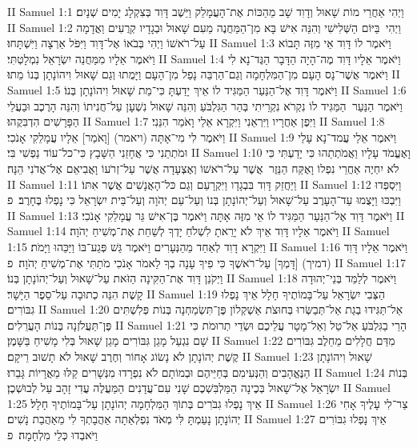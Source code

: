 II Samuel 1:1	וַיְהִי אַחֲרֵי מוֹת שָׁאוּל וְדָוִד שָׁב מֵהַכּוֹת אֶת־הָעֲמָלֵק וַיֵּשֶׁב דָּוִד בְּצִקְלָג יָמִים שְׁנָיִם׃
II Samuel 1:2	וַיְהִי  בַּיּוֹם הַשְּׁלִישִׁי וְהִנֵּה אִישׁ בָּא מִן־הַמַּחֲנֶה מֵעִם שָׁאוּל וּבְגָדָיו קְרֻעִים וַאֲדָמָה עַל־רֹאשׁוֹ וַיְהִי בְּבֹאוֹ אֶל־דָּוִד וַיִּפֹּל אַרְצָה וַיִּשְׁתָּחוּ׃
II Samuel 1:3	וַיֹּאמֶר לוֹ דָּוִד אֵי מִזֶּה תָּבוֹא וַיֹּאמֶר אֵלָיו מִמַּחֲנֵה יִשְׂרָאֵל נִמְלָטְתִּי׃
II Samuel 1:4	וַיֹּאמֶר אֵלָיו דָּוִד מֶה־הָיָה הַדָּבָר הַגֶּד־נָא לִי וַיֹּאמֶר אֲשֶׁר־נָס הָעָם מִן־הַמִּלְחָמָה וְגַם־הַרְבֵּה נָפַל מִן־הָעָם וַיָּמֻתוּ וְגַם שָׁאוּל וִיהוֹנָתָן בְּנוֹ מֵתוּ׃
II Samuel 1:5	וַיֹּאמֶר דָּוִד אֶל־הַנַּעַר הַמַּגִּיד לוֹ אֵיךְ יָדַעְתָּ כִּי־מֵת שָׁאוּל וִיהוֹנָתָן בְּנוֹ׃
II Samuel 1:6	וַיֹּאמֶר הַנַּעַר  הַמַּגִּיד לוֹ נִקְרֹא נִקְרֵיתִי בְּהַר הַגִּלְבֹּעַ וְהִנֵּה שָׁאוּל נִשְׁעָן עַל־חֲנִיתוֹ וְהִנֵּה הָרֶכֶב וּבַעֲלֵי הַפָּרָשִׁים הִדְבִּקֻהוּ׃
II Samuel 1:7	וַיִּפֶן אַחֲרָיו וַיִּרְאֵנִי וַיִּקְרָא אֵלַי וָאֹמַר הִנֵּנִי׃
II Samuel 1:8	וַיֹּאמֶר לִי מִי־אָתָּה (ויאמר) [וָאֹמַר] אֵלָיו עֲמָלֵקִי אָנֹכִי׃
II Samuel 1:9	וַיֹּאמֶר אֵלַי עֲמד־נָא עָלַי וּמֹתְתֵנִי כִּי אֲחָזַנִי הַשָּׁבָץ כִּי־כל־עוֹד נַפְשִׁי בִּי׃
II Samuel 1:10	וָאֶעֱמֹד עָלָיו וַאֲמֹתְתֵהוּ כִּי יָדַעְתִּי כִּי לֹא יִחְיֶה אַחֲרֵי נִפְלוֹ וָאֶקַּח הַנֵּזֶר  אֲשֶׁר עַל־רֹאשׁוֹ וְאֶצְעָדָה אֲשֶׁר עַל־זְרֹעוֹ וָאֲבִיאֵם אֶל־אֲדֹנִי הֵנָּה׃
II Samuel 1:11	וַיַּחֲזֵק דָּוִד בִּבְגָדָו וַיִּקְרָעֵם וְגַם כּל־הָאֲנָשִׁים אֲשֶׁר אִתּוֹ׃
II Samuel 1:12	וַיִּסְפְּדוּ וַיִּבְכּוּ וַיָּצֻמוּ עַד־הָעָרֶב עַל־שָׁאוּל וְעַל־יְהוֹנָתָן בְּנוֹ וְעַל־עַם יְהֹוָה וְעַל־בֵּית יִשְׂרָאֵל כִּי נָפְלוּ בֶּחָרֶב׃ {פ}
II Samuel 1:13	וַיֹּאמֶר דָּוִד אֶל־הַנַּעַר הַמַּגִּיד לוֹ אֵי מִזֶּה אָתָּה וַיֹּאמֶר בֶּן־אִישׁ גֵּר עֲמָלֵקִי אָנֹכִי׃
II Samuel 1:14	וַיֹּאמֶר אֵלָיו דָּוִד אֵיךְ לֹא יָרֵאתָ לִשְׁלֹחַ יָדְךָ לְשַׁחֵת אֶת־מְשִׁיחַ יְהֹוָה׃
II Samuel 1:15	וַיִּקְרָא דָוִד לְאַחַד מֵהַנְּעָרִים וַיֹּאמֶר גַּשׁ פְּגַע־בּוֹ וַיַּכֵּהוּ וַיָּמֹת׃
II Samuel 1:16	וַיֹּאמֶר אֵלָיו דָּוִד (דמיך) [דָּמְךָ] עַל־רֹאשֶׁךָ כִּי פִיךָ עָנָה בְךָ לֵאמֹר אָנֹכִי מֹתַתִּי אֶת־מְשִׁיחַ יְהֹוָה׃ {פ}
II Samuel 1:17	וַיְקֹנֵן דָּוִד אֶת־הַקִּינָה הַזֹּאת עַל־שָׁאוּל וְעַל־יְהוֹנָתָן בְּנוֹ׃
II Samuel 1:18	וַיֹּאמֶר לְלַמֵּד בְּנֵי־יְהוּדָה קָשֶׁת הִנֵּה כְתוּבָה עַל־סֵפֶר הַיָּשָׁר׃
II Samuel 1:19	הַצְּבִי יִשְׂרָאֵל עַל־בָּמוֹתֶיךָ חָלָל אֵיךְ נָפְלוּ גִבּוֹרִים׃
II Samuel 1:20	אַל־תַּגִּידוּ בְגַת אַל־תְּבַשְּׂרוּ בְּחוּצֹת אַשְׁקְלוֹן פֶּן־תִּשְׂמַחְנָה בְּנוֹת פְּלִשְׁתִּים פֶּן־תַּעֲלֹזְנָה בְּנוֹת הָעֲרֵלִים׃
II Samuel 1:21	הָרֵי בַגִּלְבֹּעַ אַל־טַל וְאַל־מָטָר עֲלֵיכֶם וּשְׂדֵי תְרוּמֹת כִּי שָׁם נִגְעַל מָגֵן גִּבּוֹרִים מָגֵן שָׁאוּל בְּלִי מָשִׁיחַ בַּשָּׁמֶן׃
II Samuel 1:22	מִדַּם חֲלָלִים מֵחֵלֶב גִּבּוֹרִים קֶשֶׁת יְהוֹנָתָן לֹא נָשׂוֹג אָחוֹר וְחֶרֶב שָׁאוּל לֹא תָשׁוּב רֵיקָם׃
II Samuel 1:23	שָׁאוּל וִיהוֹנָתָן הַנֶּאֱהָבִים וְהַנְּעִימִם בְּחַיֵּיהֶם וּבְמוֹתָם לֹא נִפְרָדוּ מִנְּשָׁרִים קַלּוּ מֵאֲרָיוֹת גָּבֵרוּ׃
II Samuel 1:24	בְּנוֹת יִשְׂרָאֵל אֶל־שָׁאוּל בְּכֶינָה הַמַּלְבִּשְׁכֶם שָׁנִי עִם־עֲדָנִים הַמַּעֲלֶה עֲדִי זָהָב עַל לְבוּשְׁכֶן׃
II Samuel 1:25	אֵיךְ נָפְלוּ גִבֹּרִים בְּתוֹךְ הַמִּלְחָמָה יְהוֹנָתָן עַל־בָּמוֹתֶיךָ חָלָל׃
II Samuel 1:26	צַר־לִי עָלֶיךָ אָחִי יְהוֹנָתָן נָעַמְתָּ לִּי מְאֹד נִפְלְאַתָה אַהֲבָתְךָ לִי מֵאַהֲבַת נָשִׁים׃
II Samuel 1:27	אֵיךְ נָפְלוּ גִבּוֹרִים וַיֹּאבְדוּ כְּלֵי מִלְחָמָה׃ {פ}
